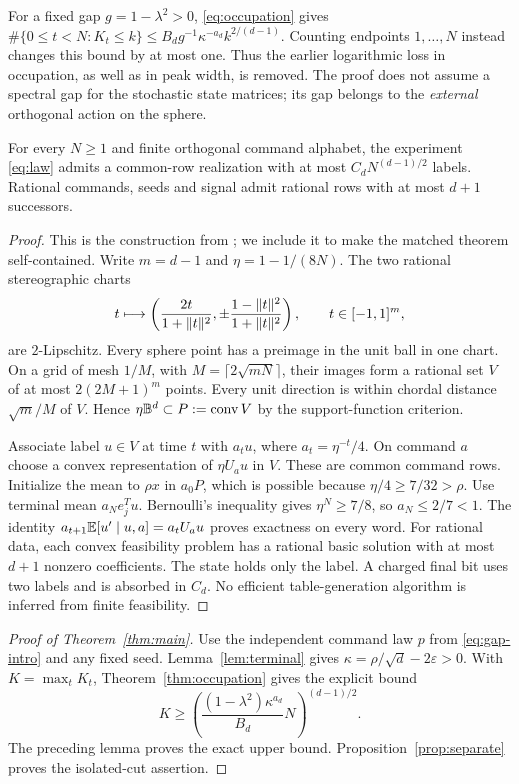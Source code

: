 For a fixed gap $g=1-\lambda^2>0$, \eqref{eq:occupation} gives
$\#\{0\le t<N:K_t\le k\}\le B_dg^{-1}\kappa^{-a_d}k^{2/(d-1)}$.
Counting endpoints $1,\ldots,N$ instead changes this bound by at most
one. Thus the earlier logarithmic loss in occupation, as well as in
peak width, is removed. The proof does not assume a spectral gap for
the stochastic state matrices; its gap belongs to the \emph{external}
orthogonal action on the sphere.

\begin{lemma}
\label{lem:net-upper}
For every $N\ge1$ and finite orthogonal command alphabet, the experiment
\eqref{eq:law} admits a common-row realization with at most
$C_dN^{(d-1)/2}$ labels. Rational commands, seeds and signal admit
rational rows with at most $d+1$ successors.
\end{lemma}
\begin{proof}
This is the construction from \cite{GTF36}; we include it to make the
matched theorem self-contained. Write $m=d-1$ and
$\eta=1-1/(8N)$. The two rational stereographic charts
\[
 t\longmapsto\left(\frac{2t}{1+\lVert t\rVert^2},
          \pm\frac{1-\lVert t\rVert^2}{1+\lVert t\rVert^2}\right),
 \qquad t\in[-1,1]^m,
\]
are $2$-Lipschitz. Every sphere point has a preimage in the unit ball
in one chart. On a grid of mesh $1/M$, with
$M=\lceil2\sqrt{mN}\rceil$, their images form a rational set $V$ of
at most $2(2M+1)^m$ points. Every unit direction is within chordal
distance $\sqrt m/M$ of $V$. Hence
$\eta\mathbb B^d\subset P:=\operatorname{conv} V$ by the support-function criterion.

Associate label $u\in V$ at time $t$ with
$a_tu$, where $a_t=\eta^{-t}/4$. On command $a$ choose a convex
representation of $\eta U_au$ in $V$. These are common command rows.
Initialize the mean to $\rho x$ in $a_0P$, which is possible because
$\eta/4\ge7/32>\rho$. Use terminal mean $a_Ne_j^Tu$.
Bernoulli's inequality gives $\eta^N\ge7/8$, so $a_N\le2/7<1$.
The identity
$a_{t+1}\mathbb E[u'\mid u,a]=a_tU_au$ proves exactness on every word.
For rational data, each convex feasibility problem has a rational basic
solution with at most $d+1$ nonzero coefficients. The state holds only
the label. A charged final bit uses two labels and is absorbed in $C_d$.
No efficient table-generation algorithm is inferred from finite feasibility.
\end{proof}

\begin{proof}[Proof of Theorem~\ref{thm:main}]
Use the independent command law $p$ from \eqref{eq:gap-intro} and any
fixed seed. Lemma~\ref{lem:terminal} gives
$\kappa=\rho/\sqrt d-2\varepsilon>0$.
With $K=\max_tK_t$, Theorem~\ref{thm:occupation} gives the explicit bound
\begin{equation}\label{eq:peak-explicit}
 K\ge\left(\frac{(1-\lambda^2)\kappa^{a_d}}{B_d}N\right)^{(d-1)/2}.
\end{equation}
The preceding lemma proves the exact upper bound.
Proposition~\ref{prop:separate} proves the isolated-cut assertion.
\end{proof}

